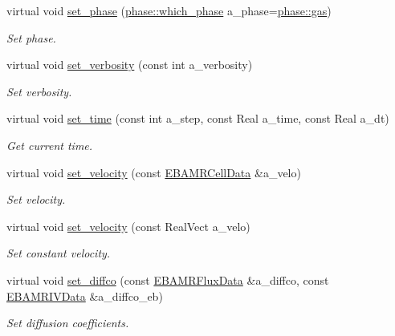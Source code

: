 \begin{DoxyCompactItemize}
virtual void \hyperlink{classcdr__solver_a04f19a7be66331a69557e383d5751b66}{set\+\_\+phase} (\hyperlink{namespacephase_a23c76f548a5eb1955ed8c929c541108b}{phase\+::which\+\_\+phase} a\+\_\+phase=\hyperlink{namespacephase_a23c76f548a5eb1955ed8c929c541108bad0a7c1eb8fd916c8b7ec85be0fd23b38}{phase\+::gas})
\begin{DoxyCompactList}\small\item\em Set phase. \end{DoxyCompactList}\item 
virtual void \hyperlink{classcdr__solver_a3ebd6308dcd81fae4da75e0f2b474c6f}{set\+\_\+verbosity} (const int a\+\_\+verbosity)
\begin{DoxyCompactList}\small\item\em Set verbosity. \end{DoxyCompactList}\item 
virtual void \hyperlink{classcdr__solver_aac5f5dc42905b6828cfe2337526a7715}{set\+\_\+time} (const int a\+\_\+step, const Real a\+\_\+time, const Real a\+\_\+dt)
\begin{DoxyCompactList}\small\item\em Get current time. \end{DoxyCompactList}\item 
virtual void \hyperlink{classcdr__solver_a0e7432be7debc643682d7f75de6f744d}{set\+\_\+velocity} (const \hyperlink{type__definitions_8H_a7e610f301989e5e07781c5e338bdb7c3}{E\+B\+A\+M\+R\+Cell\+Data} \&a\+\_\+velo)
\begin{DoxyCompactList}\small\item\em Set velocity. \end{DoxyCompactList}\item 
virtual void \hyperlink{classcdr__solver_abbe3eae80b86bacef0dff1e8612b3098}{set\+\_\+velocity} (const Real\+Vect a\+\_\+velo)
\begin{DoxyCompactList}\small\item\em Set constant velocity. \end{DoxyCompactList}\item 
virtual void \hyperlink{classcdr__solver_a3104438605043d58074c9ca843fd75c6}{set\+\_\+diffco} (const \hyperlink{type__definitions_8H_aadad278b2e5d3d4abcf9032f90ba78c3}{E\+B\+A\+M\+R\+Flux\+Data} \&a\+\_\+diffco, const \hyperlink{type__definitions_8H_a6b8fa905d55cbb491b52180386f0e0c1}{E\+B\+A\+M\+R\+I\+V\+Data} \&a\+\_\+diffco\+\_\+eb)
\begin{DoxyCompactList}\small\item\em Set diffusion coefficients. \end{DoxyCompactList}\item 

\end{DoxyCompactItemize}
